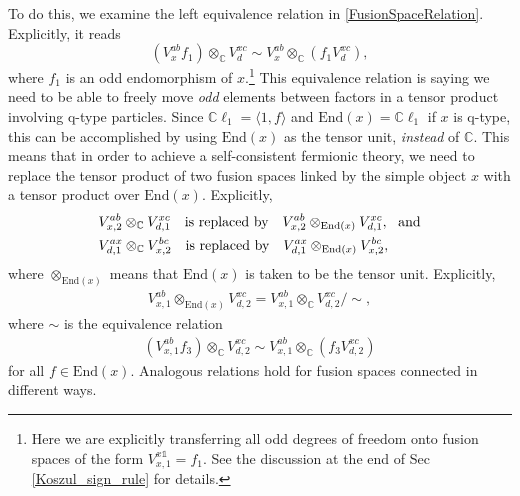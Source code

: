 \documentclass[12pt,a4paper]{article}
\newcommand{\tp}{\otimes}
\newcommand{\unit}{\mathds{1}}
\newcommand{\cc}{\mathbb{C}}
\newcommand\be            {\begin{equation}}
\newcommand\ee            {\end{equation}}
\newcommand\ba            {\begin{aligned}}
\newcommand\ea            {\end{aligned}}
\newcommand{\End}{\text{End}}
\newcommand{\cl}{\mathbb{C}\ell}
\begin{document}
To do this, we examine the left equivalence relation in \eqref{FusionSpaceRelation}. 
Explicitly, it reads
\be (V^{ab}_x f_1) \tp_\cc V^{xc}_d \sim V^{ab}_x \tp_\cc (f_1 V^{xc}_d),\ee
where $f_1$ is an odd endomorphism of $x$.\footnote{Here we are explicitly transferring all odd degrees of freedom onto fusion spaces of the form $V^{x\unit}_{x,1} = f_1$. See the discussion at the end of Sec \ref{Koszul_sign_rule} for details.}
This equivalence relation is saying we need to be able to freely move {\it odd} elements between factors in a tensor product involving q-type particles. 
Since $\cl_1 = \langle1,f\rangle$ and $\End(x) = \cl_1$ if $x$ is q-type, this can be accomplished by using $\End(x)$ as the tensor unit, {\it instead} of $\cc$. 
This means that in order to achieve a self-consistent fermionic theory, we need to replace the tensor product of two fusion spaces linked by the simple object $x$ with a tensor product over $\End(x)$. 
 Explicitly, 
\be \ba
 &V^{ab}_{x,2} \tp_{\mathbb{C}} V^{xc}_{d,1}\quad  \text{is replaced by} \quad V^{ab}_{x,2} \tp_{\text{End}(x)} V^{xc}_{d,1},\ \  {\rm and} \\ 
  &V^{ax}_{d,1} \tp_{\mathbb{C}} V^{bc}_{x,2}\quad  \text{is replaced by} \quad V^{ax}_{d,1} \tp_{\End(x)} V^{bc}_{x,2},
\ea 
\ee
where $\tp_{\End(x)}$ means that $\End(x)$ is taken to be the tensor unit. Explicitly, %
\begin{align}
V^{ab}_{x,1} \tp_{\text{End}(x)} V^{xc}_{d,2} = V^{ab}_{x,1} \tp_{\mathbb{C}}V^{xc}_{d,2}/ \sim,
\label{qtensor}
\end{align}
where $\sim$ is the equivalence relation 
\begin{align} \label{equivreln}
(V^{ab}_{x,1} f_3) \tp_{\mathbb{C}}V^{xc}_{d,2} \sim V^{ab}_{x,1} \tp_{\mathbb{C}} (f_3 V^{xc}_{d,2})
\end{align}
for all $f \in \text{End}(x)$. 
Analogous relations hold for fusion spaces connected in different ways. 
\end{document}
